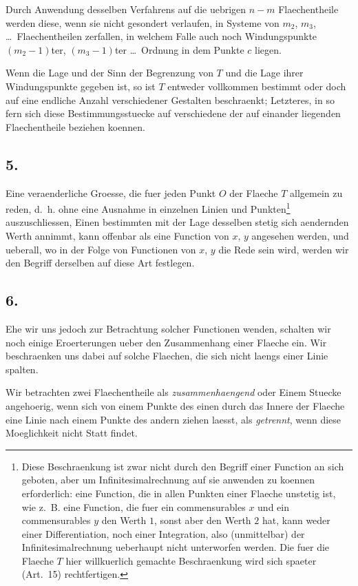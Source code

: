 \documentclass[12pt,a4paper]{book}
\theoremstyle{definition}
\theoremstyle{remark}
\begin{document}
Durch Anwendung desselben Verfahrens auf die uebrigen $n - m$ Flaechentheile werden diese, wenn sie nicht gesondert verlaufen, in Systeme von $m_2$, $m_3$, \dots\ Flaechentheilen zerfallen, in welchem Falle auch noch Windungspunkte $(m_2 - 1)$ter, $(m_3 - 1)$ter \dots\ Ordnung in dem Punkte $c$ liegen.

Wenn die Lage und der Sinn der Begrenzung von $T$ und die Lage ihrer Windungspunkte gegeben ist, so ist $T$ entweder vollkommen bestimmt oder doch auf eine endliche Anzahl verschiedener Gestalten beschraenkt; Letzteres, in so fern sich diese Bestimmungsstuecke auf verschiedene der auf einander liegenden Flaechentheile beziehen koennen.

\subsection*{5.}

Eine veraenderliche Groesse, die fuer jeden Punkt $O$ der Flaeche $T$ allgemein zu reden, d.\ h. ohne eine Ausnahme in einzelnen Linien und Punkten\footnote{Diese Beschraenkung ist zwar nicht durch den Begriff einer Function an sich geboten, aber um Infinitesimalrechnung auf sie anwenden zu koennen erforderlich: eine Function, die in allen Punkten einer Flaeche unstetig ist, wie z.\ B. eine Function, die fuer ein commensurables $x$ und ein commensurables $y$ den Werth $1$, sonst aber den Werth $2$ hat, kann weder einer Differentiation, noch einer Integration, also (unmittelbar) der Infinitesimalrechnung ueberhaupt nicht unterworfen werden. Die fuer die Flaeche $T$ hier willkuerlich gemachte Beschraenkung wird sich spaeter (Art.\ 15) rechtfertigen.} auszuschliessen, Einen bestimmten mit der Lage desselben stetig sich aendernden Werth annimmt, kann offenbar als eine Function von $x$, $y$ angesehen werden, und ueberall, wo in der Folge von Functionen von $x$, $y$ die Rede sein wird, werden wir den Begriff derselben auf diese Art festlegen.

\subsection*{6.}

Ehe wir uns jedoch zur Betrachtung solcher Functionen wenden, schalten wir noch einige Eroerterungen ueber den Zusammenhang einer Flaeche ein. Wir beschraenken uns dabei auf solche Flaechen, die sich nicht laengs einer Linie spalten.

Wir betrachten zwei Flaechentheile als \emph{zusammenhaengend} oder Einem Stuecke angehoerig, wenn sich von einem Punkte des einen durch das Innere der Flaeche eine Linie nach einem Punkte des andern ziehen laesst, als \emph{getrennt}, wenn diese Moeglichkeit nicht Statt findet.
\end{document}
